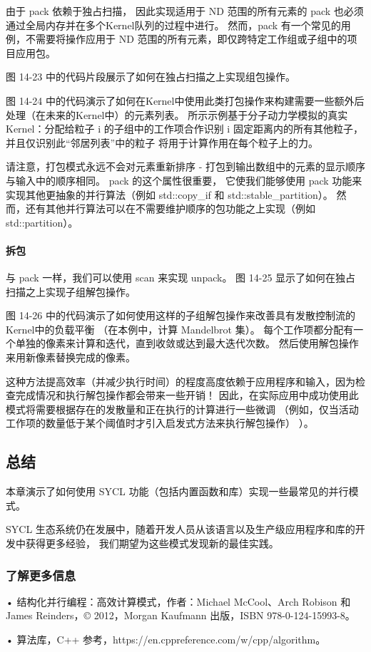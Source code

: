 由于 pack 依赖于独占扫描，
因此实现适用于 ND 范围的所有元素的 pack 也必须通过全局内存并在多个Kernel队列的过程中进行。 
然而，pack 有一个常见的用例，不需要将操作应用于 ND 范围的所有元素，即仅跨特定工作组或子组中的项目应用包。

图 14-23 中的代码片段展示了如何在独占扫描之上实现组包操作。

图 14-24 中的代码演示了如何在Kernel中使用此类打包操作来构建需要一些额外后处理（在未来的Kernel中）的元素列表。 
所示示例基于分子动力学模拟的真实Kernel：分配给粒子 i 的子组中的工作项合作识别 i 固定距离内的所有其他粒子，
并且仅识别此“邻居列表”中的粒子 将用于计算作用在每个粒子上的力。

请注意，打包模式永远不会对元素重新排序 - 打包到输出数组中的元素的显示顺序与输入中的顺序相同。 
pack 的这个属性很重要，
它使我们能够使用 pack 功能来实现其他更抽象的并行算法（例如 std::copy\_if 和 std::stable\_partition）。 
然而，还有其他并行算法可以在不需要维护顺序的包功能之上实现（例如 std::partition）。

\paragraph{拆包}

与 pack 一样，我们可以使用 scan 来实现 unpack。 图 14-25 显示了如何在独占扫描之上实现子组解包操作。

图 14-26 中的代码演示了如何使用这样的子组解包操作来改善具有发散控制流的Kernel中的负载平衡
（在本例中，计算 Mandelbrot 集）。 每个工作项都分配有一个单独的像素来计算和迭代，直到收敛或达到最大迭代次数。 
然后使用解包操作来用新像素替换完成的像素。

这种方法提高效率（并减少执行时间）的程度高度依赖于应用程序和输入，因为检查完成情况和执行解包操作都会带来一些开销！ 
因此，在实际应用中成功使用此模式将需要根据存在的发散量和正在执行的计算进行一些微调
（例如，仅当活动工作项的数量低于某个阈值时才引入启发式方法来执行解包操作） ）。

\subsection{总结}
本章演示了如何使用 SYCL 功能（包括内置函数和库）实现一些最常见的并行模式。

SYCL 生态系统仍在发展中，随着开发人员从该语言以及生产级应用程序和库的开发中获得更多经验，
我们期望为这些模式发现新的最佳实践。

\subsubsection{了解更多信息}
• 结构化并行编程：高效计算模式，作者：Michael McCool、Arch Robison 和 James Reinders，© 2012，Morgan Kaufmann 出版，ISBN 978-0-124-15993-8。

• 算法库，C++ 参考，https://en.cppreference.com/w/cpp/algorithm。